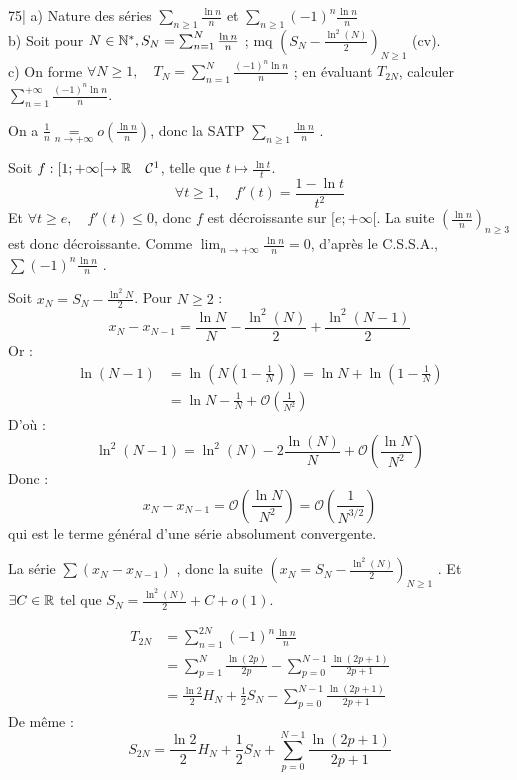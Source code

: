 
\begin{statementbox}
75| 
a) Nature des séries $\sum_{n \ge 1} \frac{\ln n}{n}$ et $\sum_{n \ge 1} (-1)^n \frac{\ln n}{n}$ \\
b) Soit pour $N \in \mathbb N^*, S_N = \sum_{n=1}^N \frac{\ln n}{n}$ ; mq $\left(S_N - \frac{\ln^2(N)}{2}\right)_{N \ge 1}$ (cv). \\
c) On forme $\forall N \ge 1, \quad T_N = \sum_{n=1}^N \frac{(-1)^n \ln n}{n}$ ; en évaluant $T_{2N}$, calculer $\sum_{n=1}^{+\infty} \frac{(-1)^n \ln n}{n}$.
\end{statementbox}

\begin{solution}
On a $\frac{1}{n} \underset{n \to +\infty}{=} o\left(\frac{\ln n}{n}\right)$, donc la SATP $\sum_{n \geq 1} \frac{\ln n}{n}$ .

Soit $f : [1; +\infty[ \to \mathbb R \quad \mathcal{C}^1$, telle que $t \mapsto \frac{\ln t}{t}$. 
\[ \forall t \geq 1, \quad f'(t) = \frac{1-\ln t}{t^2} \]
Et $\forall t \geq e, \quad f'(t) \leq 0$, donc $f$ est décroissante sur $[e; +\infty[$.
La suite $\left( \frac{\ln n}{n} \right)_{n \geq 3}$ est donc décroissante.
Comme $\lim_{n \to +\infty} \frac{\ln n}{n} = 0$, d'après le C.S.S.A., $\sum (-1)^n \frac{\ln n}{n}$ .

Soit $x_N = S_N - \frac{\ln^2 N}{2}$. Pour $N \geq 2$ :
\[ x_N - x_{N-1} = \frac{\ln N}{N} - \frac{\ln^2(N)}{2} + \frac{\ln^2(N-1)}{2} \]
Or :
\begin{align*}
\ln(N-1) &= \ln\left(N\left(1-\frac{1}{N}\right)\right) = \ln N + \ln\left(1-\frac{1}{N}\right) \\
&= \ln N - \frac{1}{N} + \mathcal{O}\left(\frac{1}{N^2}\right)
\end{align*}
D'où :
\[ \ln^2(N-1) = \ln^2(N) - 2\frac{\ln(N)}{N} + \mathcal{O}\left(\frac{\ln N}{N^2}\right) \]
Donc :
\[ x_N - x_{N-1} = \mathcal{O}\left(\frac{\ln N}{N^2}\right) = \mathcal{O}\left(\frac{1}{N^{3/2}}\right) \]
qui est le terme général d'une série absolument convergente.

La série $\sum (x_N - x_{N-1})$ , donc la suite $\left(x_N = S_N - \frac{\ln^2(N)}{2}\right)_{N \geq 1}$ .
Et $\exists C \in \mathbb R$ tel que $S_N = \frac{\ln^2(N)}{2} + C + o(1)$.

\begin{align*}
T_{2N} &= \sum_{n=1}^{2N} (-1)^n \frac{\ln n}{n} \\
&= \sum_{p=1}^N \frac{\ln(2p)}{2p} - \sum_{p=0}^{N-1} \frac{\ln(2p+1)}{2p+1} \\
&= \frac{\ln 2}{2} H_N + \frac{1}{2} S_N - \sum_{p=0}^{N-1} \frac{\ln(2p+1)}{2p+1}
\end{align*}
De même :
\[ S_{2N} = \frac{\ln 2}{2} H_N + \frac{1}{2} S_N + \sum_{p=0}^{N-1} \frac{\ln(2p+1)}{2p+1} \]


\end{solution}
